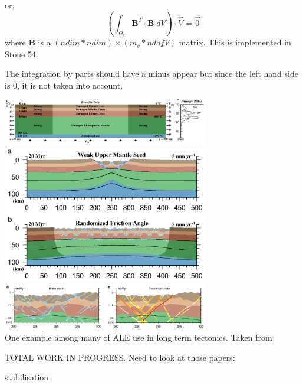 or, 
\[
\left( \int_{\Omega_e} {\bm B}^T  \cdot {\bm B} \; dV \right)\cdot \vec{V} = \vec{0}
\]
where ${\bm B}$ is a $(ndim*ndim) \times (m_v*ndofV)$ matrix. This is implemented in 
Stone 54.

\begin{remark}
The integration by parts should have a minus appear but since the left hand side 
is 0, it is not taken into account. 
\end{remark}



\begin{center}
\includegraphics[width=9cm]{images/freesurface/nabp17a}\\
\includegraphics[width=9cm]{images/freesurface/nabp17b}\\
\includegraphics[width=9cm]{images/freesurface/nabp17c}\\
{\scriptsize One example among many of ALE use in long term tectonics. Taken from \cite{nabp17}}
\end{center}




\vspace{4cm}
TOTAL WORK IN PROGRESS. Need to look at those papers:
\cite{huli88}
\cite{bens89}
\cite{dumg11}
\cite{dumy16} 
\cite{anmp15}
\cite{krwd12}
\cite{stcl10}
\cite{maie12}
\cite{guez96}\cite{zhgm96}
\cite{elsp04}

stabilisation \cite{kamm10,qube11,dumg11}
